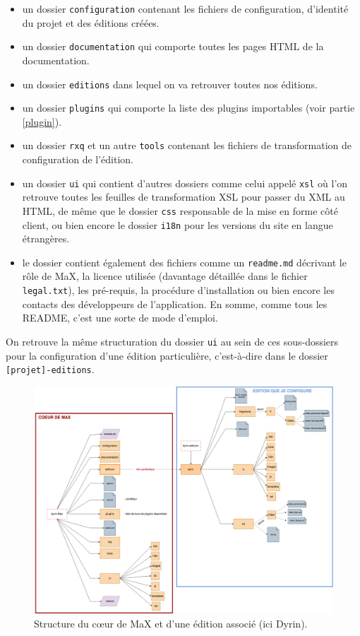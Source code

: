 \documentclass[a4paper,12pt,twoside]{book}
\begin{document}
\begin{itemize}
    \item un dossier \texttt{configuration} contenant les fichiers de configuration, d'identité du projet et des éditions créées.
    \item un dossier \texttt{documentation} qui comporte toutes les pages \acrshort{HTML} de la documentation.
    \item un dossier \texttt{editions} dans lequel on va retrouver toutes nos éditions.
    \item un dossier \texttt{plugins} qui comporte la liste des plugins importables (voir partie \ref{plugin}).
    \item un dossier \texttt{rxq} et un autre \texttt{tools} contenant les fichiers de transformation de configuration de l'édition.
    \item un dossier\label{ui} \texttt{ui} qui contient d'autres dossiers comme celui appelé \texttt{xsl} où l'on retrouve toutes les feuilles de transformation \acrshort{XSL} pour passer du XML au \acrshort{HTML}, de même que le dossier \texttt{css} responsable de la mise en forme côté client, ou bien encore le dossier \texttt{i18n} pour les versions du site en langue étrangères.
    \item le dossier contient également des fichiers comme un \texttt{readme.md} décrivant le rôle de MaX, la licence utilisée (davantage détaillée dans le fichier \texttt{legal.txt}), les pré-requis, la procédure d'installation ou bien encore les contacts des développeurs de l'application. En somme, comme tous les README, c'est une sorte de mode d'emploi.
\end{itemize}
On retrouve la même structuration du dossier \texttt{ui} au sein de ces sous-dossiers pour la configuration d'une édition particulière, c'est-à-dire dans le dossier \texttt{[projet]-editions}.


\begin{figure}[H]
    \centering
    \includegraphics[width=18cm]{img/MaX/structure_MaX.png}
    \caption{Structure du c\oe{}ur de MaX et d'une édition associé (ici Dyrin).}
    \label{arbo}
\end{figure}
\end{document}
